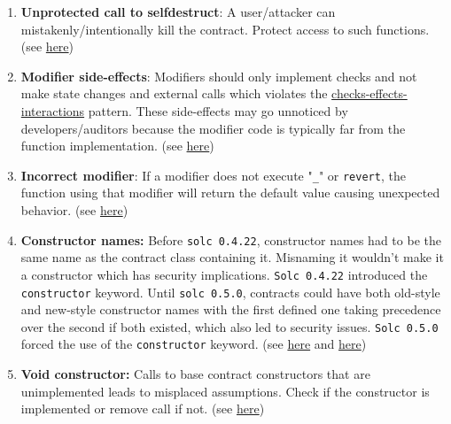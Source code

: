 \begin{enumerate}
\item\textbf{Unprotected call to selfdestruct}: A user/attacker can mistakenly/intentionally kill the contract. Protect access to such functions. (see \href{https://swcregistry.io/docs/SWC-106}{here})

\item\textbf{Modifier side-effects}: Modifiers should only implement checks and not make state changes and external calls which violates the \href{https://solidity.readthedocs.io/en/develop/security-considerations.html\#use-the-checks-effects-interactions-pattern}{checks-effects-interactions} pattern. These side-effects may go unnoticed by developers/auditors because the modifier code is typically far from the function implementation. (see \href{https://consensys.net/blog/blockchain-development/solidity-best-practices-for-smart-contract-security/}{here})

\item\textbf{Incorrect modifier}: If a modifier does not execute "\verb|_|" or \verb|revert|, the function using that modifier will return the default value causing unexpected behavior. (see \href{https://github.com/crytic/slither/wiki/Detector-Documentation\#incorrect-modifier}{here})

\item\textbf{Constructor names: }Before \verb|solc 0.4.22|, constructor names had to be the same name as the contract class containing it. Misnaming it wouldn’t make it a constructor which has security implications. \verb|Solc 0.4.22| introduced the \verb|constructor| keyword. Until \verb|solc 0.5.0|, contracts could have both old-style and new-style constructor names with the first defined one taking precedence over the second if both existed, which also led to security issues. \verb|Solc 0.5.0| forced the use of the \verb|constructor| keyword. (see \href{https://github.com/crytic/slither/wiki/Detector-Documentation\#multiple-constructor-schemes}{here} and \href{https://swcregistry.io/docs/SWC-118}{here})

\item\textbf{Void constructor: }Calls to base contract constructors that are unimplemented leads to misplaced assumptions. Check if the constructor is implemented or remove call if not. (see \href{https://github.com/crytic/slither/wiki/Detector-Documentation\#void-constructor}{here})


\end{enumerate}
